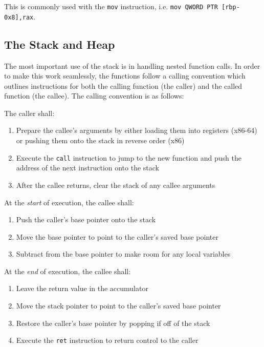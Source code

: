 This is commonly used with the \texttt{mov} instruction, i.e. \texttt{mov
QWORD PTR [rbp-0x8],rax}. 

\subsection{The Stack and Heap}
The most important use of the stack is in handling nested function calls. In
order to make this work seamlessly, the functions follow a calling convention
which outlines instructions for both the calling function (the caller) and the
called function (the callee). The calling convention is as follows:

The caller shall:
\begin{enumerate}
    \item Prepare the callee's arguments by either loading them into registers
        (x86-64) or pushing them onto the stack in reverse order (x86)
    \item Execute the \texttt{call} instruction to jump to the new function and
        push the address of the next instruction onto the stack
    \item After the callee returns, clear the stack of any callee arguments
\end{enumerate}

At the \emph{start} of execution, the callee shall:
\begin{enumerate}
    \item Push the caller's base pointer onto the stack
    \item Move the base pointer to point to the caller's saved base pointer
    \item Subtract from the base pointer to make room for any local variables
\end{enumerate}

At the \emph{end} of execution, the callee shall:
\begin{enumerate}
    \item Leave the return value in the accumulator
    \item Move the stack pointer to point to the caller's saved base pointer
    \item Restore the caller's base pointer by popping if off of the stack
    \item Execute the \texttt{ret} instruction to return control to the caller
\end{enumerate}

